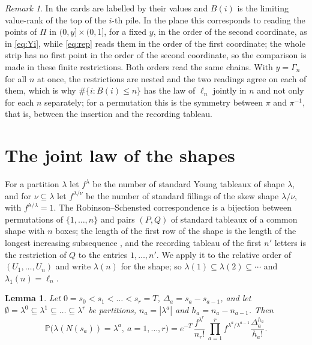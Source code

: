 \documentclass[11pt]{amsart}
\newtheorem{lemma}[theorem]{Lemma}
\theoremstyle{remark}
\newtheorem{remark}[theorem]{Remark}
\numberwithin{equation}{section}
\newcommand{\Pp}{\mathbb P}
\begin{document}
\begin{remark}\label{rem:AD93}
In \cite{AD93} the cards are labelled by their values and $B(i)$ is the limiting value-rank of the top of the $i$-th pile. In the plane this corresponds to reading the points of $\Pi$ in $(0,y]\times(0,1]$, for a fixed $y$, in the order of the second coordinate, as in \eqref{eq:Yi}, while \eqref{eq:rep} reads them in the order of the first coordinate; the whole strip has no first point in the order of the second coordinate, so the comparison is made in these finite restrictions. Both orders read the same chains. With $y=\Gamma_n$ for all $n$ at once, the restrictions are nested and the two readings agree on each of them, which is why $\#\{i:B(i)\le n\}$ has the law of $\ell_n$ jointly in $n$ and not only for each $n$ separately; for a permutation this is the symmetry between $\pi$ and $\pi^{-1}$, that is, between the insertion and the recording tableau.
\end{remark}

\section{The joint law of the shapes}\label{sec:shapes}

For a partition $\lambda$ let $f^\lambda$ be the number of standard Young tableaux of shape $\lambda$, and for $\nu\subseteq\lambda$ let $f^{\lambda/\nu}$ be the number of standard fillings of the skew shape $\lambda/\nu$, with $f^{\lambda/\lambda}=1$. The Robinson--Schensted correspondence is a bijection between permutations of $\{1,\dots,n\}$ and pairs $(P,Q)$ of standard tableaux of a common shape with $n$ boxes; the length of the first row of the shape is the length of the longest increasing subsequence \cite{Sch61}, and the recording tableau of the first $n'$ letters is the restriction of $Q$ to the entries $1,\dots,n'$. We apply it to the relative order of $(U_1,\dots,U_n)$ and write $\lambda(n)$ for the shape; so $\lambda(1)\subseteq\lambda(2)\subseteq\cdots$ and $\lambda_1(n)=\ell_n$.

\begin{lemma}\label{lem:weight}
Let $0=s_0<s_1<\dots<s_r=T$, $\Delta_a=s_a-s_{a-1}$, and let $\emptyset=\lambda^0\subseteq\lambda^1\subseteq\dots\subseteq\lambda^r$ be partitions, $n_a=|\lambda^a|$ and $h_a=n_a-n_{a-1}$. Then
\[
\Pp\bigl(\lambda(N(s_a))=\lambda^a,\ a=1,\dots,r\bigr)=e^{-T}\,\frac{f^{\lambda^r}}{n_r!}\,\prod_{a=1}^r f^{\lambda^a/\lambda^{a-1}}\frac{\Delta_a^{h_a}}{h_a!}.
\]
\end{lemma}
\end{document}
